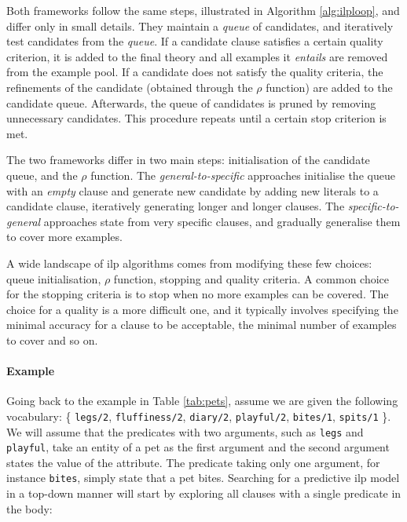 Both frameworks follow the same steps, illustrated in Algorithm \ref{alg:ilploop}, and differ only in small details.
They maintain a \textit{queue} of candidates, and iteratively test candidates from the \textit{queue}.
If a candidate clause satisfies a certain quality criterion, it is added to the final theory and all examples it \textit{entails} are removed from the example pool.
If a candidate does not satisfy the quality criteria, the refinements of the candidate (obtained through the $\rho$ function) are added to the candidate queue.
Afterwards, the queue of candidates is pruned by removing unnecessary candidates.
This procedure repeats until a certain stop criterion is met.



The two frameworks differ in two main steps: initialisation of the candidate queue, and the $\rho$ function.
The \textit{general-to-specific} approaches initialise the queue with an \textit{empty} clause and generate new candidate by adding new literals to a candidate clause, iteratively generating longer and longer clauses.
The \textit{specific-to-general} approaches state from very specific clauses, and gradually generalise them to cover more examples.




A wide landscape of \gls{ilp} algorithms comes from modifying these few choices: queue initialisation, $\rho$ function, stopping and quality criteria.
A common choice for the stopping criteria is to stop when no more examples can be covered.
The choice for a quality is a more difficult one, and it typically involves specifying the minimal accuracy for a clause to be acceptable, the minimal number of examples to cover and so on.




\paragraph{\textbf{Example}}
Going back to the example in Table \ref{tab:pets}, assume we are given the following vocabulary: \{ \texttt{legs/2}, \texttt{fluffiness/2}, \texttt{diary/2}, \texttt{playful/2}, \texttt{bites/1}, \texttt{spits/1} \}.
We will assume that the predicates with two arguments, such as \texttt{legs} and \texttt{playful}, take an entity of a pet as the first argument and the second argument states the value of the attribute.
The predicate taking only one argument, for instance \texttt{bites}, simply state that a pet bites.
Searching for a predictive \gls{ilp} model in a top-down manner will start by exploring all clauses with a single predicate in the body:

